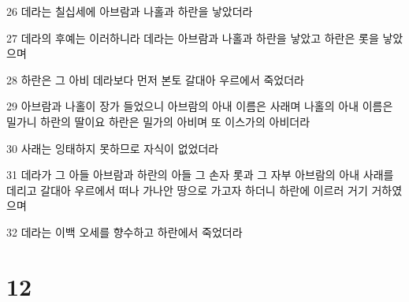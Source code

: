 \par 26 데라는 칠십세에 아브람과 나홀과 하란을 낳았더라
\par 27 데라의 후예는 이러하니라 데라는 아브람과 나홀과 하란을 낳았고 하란은 롯을 낳았으며
\par 28 하란은 그 아비 데라보다 먼저 본토 갈대아 우르에서 죽었더라
\par 29 아브람과 나홀이 장가 들었으니 아브람의 아내 이름은 사래며 나홀의 아내 이름은 밀가니 하란의 딸이요 하란은 밀가의 아비며 또 이스가의 아비더라
\par 30 사래는 잉태하지 못하므로 자식이 없었더라
\par 31 데라가 그 아들 아브람과 하란의 아들 그 손자 롯과 그 자부 아브람의 아내 사래를 데리고 갈대아 우르에서 떠나 가나안 땅으로 가고자 하더니 하란에 이르러 거기 거하였으며
\par 32 데라는 이백 오세를 향수하고 하란에서 죽었더라

\chapter{12}

